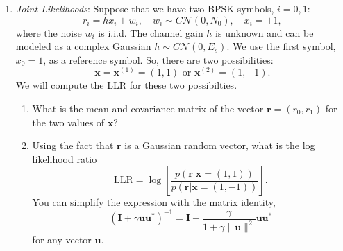 \documentclass[11pt]{article}
\newcommand{\rbf}{\mathbf{r}}
\newcommand{\ubf}{\mathbf{u}}
\newcommand{\xbf}{\mathbf{x}}
\newcommand{\Ibf}{\mathbf{I}}
\begin{document}
\begin{enumerate}
\begin{enumerate}[label=(\alph*)]
\item If $h[n]$ is a narrowband fading process with Jake's spectrum then its auto-correlation is
\[
    R[k] = E_s J_0(2\pi f_{\rm max} k T)
\]
where $E_s$ is the energy per sample, 
$f_{\rm max}$ is the maximum Doppler spread and $T$ is the sample period.
Write and plot the normalized MSE, 
$\epsilon/E_s$ as a function of $f_{\rm max}LT$ for the case when $N_v=0$.
Note that when there is zero noise, $\mathrm{MSE}$, represents the bias squared.

\item In the above model, there is one reference symbol every $2L$ samples,
so the overhead is $1/(2L)$.
Suppose that $f_{\rm max} = $\, \SI{100}{Hz}, and the sample period is $T=$\, \SI{1}{\micro\second}.  Using the model in part (b), 
what is the minimum overhead if we need the MSE, $\epsilon$,
to be less than \SI{20}{dB} below $E_s$?

\end{enumerate}


\item \emph{Joint Likelihoods}:  
Suppose that we have two BPSK symbols, $i=0,1$:
\[
    r_i = hx_i + w_i, \quad w_i \sim C{\mathcal N}(0,N_0),    
    \quad x_i = \pm 1,
\]
where the noise $w_i$ is i.i.d.  The channel gain $h$ is unknown and can
be modeled as a complex Gaussian $h \sim C{\mathcal N}(0,E_s)$.
We use the first symbol, $x_0=1$, as a reference symbol. So, there are
two possibilities:  
\[
    \xbf = \xbf^{(1)}=(1,1) \mbox{ or } \xbf^{(2)}=(1,-1).
\]
We will compute the LLR for these two possibilties.
\begin{enumerate}[label=(\alph*)]
\item What is the mean and covariance matrix of the vector $\rbf=(r_0,r_1)$
for the two values of $\xbf$?

\item Using the fact that $\rbf$ is a Gaussian random vector,
what is the log likelihood ratio
\[
    \mathrm{LLR} = \log \left[ \frac{p(\rbf|\xbf=(1,1))}{p(\rbf|\xbf=(1,-1))} \right].
\]
You can simplify the expression with the matrix identity,
\[
    (\Ibf + \gamma \ubf \ubf^*)^{-1} = \Ibf - \frac{\gamma}{1 + \gamma\|\ubf\|^2} \ubf\ubf^*
\]
for any vector $\ubf$.
\end{enumerate}


\end{enumerate}
\end{document}
